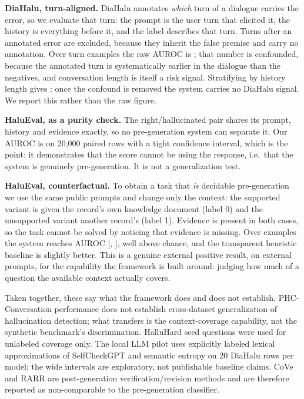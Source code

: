 \documentclass[conference,a4paper]{IEEEtran}
\begin{document}
\textbf{DiaHalu, turn-aligned.} DiaHalu annotates \emph{which} turn of a
dialogue carries the error, so we evaluate that turn: the prompt is the user
turn that elicited it, the history is everything before it, and the label
describes that turn. Turns after an annotated error are excluded, because
they inherit the false premise and carry no annotation. Over \dian{} turn
examples the raw AUROC is \diaauroc{}; that number is confounded, because
the annotated turn is systematically earlier in the dialogue than the
negatives, and conversation length is itself a risk signal. Stratifying by
history length gives \diastr{}: once the confound is removed the system
carries no DiaHalu signal. We report this rather than the raw figure.

\textbf{HaluEval, as a purity check.} The right/hallucinated pair shares its
prompt, history and evidence exactly, so no pre-generation system can
separate it. Our AUROC is \haluauroc{} on 20{,}000 paired rows with a tight
confidence interval, which is the point: it demonstrates that the score
cannot be using the response, i.e.\ that the system is genuinely
pre-generation. It is not a generalization test.

\textbf{HaluEval, counterfactual.} To obtain a task that \emph{is} decidable
pre-generation we use the same public prompts and change only the context:
the supported variant is given the record's own knowledge document (label 0)
and the unsupported variant another record's (label 1). Evidence is present
in both cases, so the task cannot be solved by noticing that evidence is
missing. Over \cfan{} examples the system reaches AUROC \cfauroc{}
[\cfaurocmin, \cfaurocmax], well above chance, and the transparent
heuristic baseline is slightly better. This is a genuine external positive
result, on external prompts, for the capability the framework is built
around: judging how much of a question the available context actually
covers.

Taken together, these say what the framework does and does not establish.
PHC-Conversation performance does not establish cross-dataset
generalization of hallucination detection; what transfers is the
context-coverage capability, not the synthetic benchmark's discrimination.
HalluHard seed questions were used for unlabeled coverage only. The local
LLM pilot uses explicitly labeled lexical approximations of SelfCheckGPT and
semantic entropy on 20 DiaHalu rows per model; the wide intervals are
exploratory, not publishable baseline claims. CoVe and RARR are
post-generation verification/revision methods and are therefore reported as
non-comparable to the pre-generation classifier.
\end{document}
